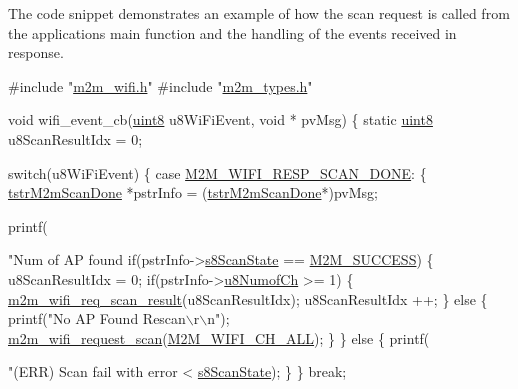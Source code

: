 The code snippet demonstrates an example of how the scan request is called from the application\textquotesingle{}s main function and the handling of the events received in response. 
\begin{DoxyCode}
\textcolor{preprocessor}{#include "\hyperlink{m2m__wifi_8h}{m2m\_wifi.h}"}
\textcolor{preprocessor}{#include "\hyperlink{m2m__types_8h}{m2m\_types.h}"}

\textcolor{keywordtype}{void} wifi\_event\_cb(\hyperlink{group__DataT_ga4df709a77647e870bbf1d955b8edc9a6}{uint8} u8WiFiEvent, \textcolor{keywordtype}{void} * pvMsg)
\{
    \textcolor{keyword}{static} \hyperlink{group__DataT_ga4df709a77647e870bbf1d955b8edc9a6}{uint8}    u8ScanResultIdx = 0;
    
    \textcolor{keywordflow}{switch}(u8WiFiEvent)
    \{
    \textcolor{keywordflow}{case} \hyperlink{group__WlanEnums_gga064de09dec1d5e88ed8d075fa40f57dead835febbe18b7e3cc6ce4693951354fe}{M2M\_WIFI\_RESP\_SCAN\_DONE}:
        \{
            \hyperlink{structtstrM2mScanDone}{tstrM2mScanDone} *pstrInfo = (\hyperlink{structtstrM2mScanDone}{tstrM2mScanDone}*)pvMsg;
            
            printf(\textcolor{stringliteral}{"Num of AP found %
            \textcolor{keywordflow}{if}(pstrInfo->\hyperlink{structtstrM2mScanDone_adf06f5d0db8d0fb98e7674672ee8439d}{s8ScanState} == \hyperlink{nm__common_8h_a9ef27ba27aafdd1aa3a79d3ba2c36b8f}{M2M\_SUCCESS})
            \{
                u8ScanResultIdx = 0;
                \textcolor{keywordflow}{if}(pstrInfo->\hyperlink{structtstrM2mScanDone_a1303b806dd93bfdd4b4a51ad750b023b}{u8NumofCh} >= 1)
                \{
                    \hyperlink{group__WifiReqScanResult_ga2585ee08ee8ecac67155ec99dd4d0863}{m2m\_wifi\_req\_scan\_result}(u8ScanResultIdx);
                    u8ScanResultIdx ++;
                \}
                \textcolor{keywordflow}{else}
                \{
                    printf(\textcolor{stringliteral}{"No AP Found Rescan\(\backslash\)r\(\backslash\)n"});
                    \hyperlink{group__WifiRequestScanFn_ga499dfa24a19c2e84776aeabedf897135}{m2m\_wifi\_request\_scan}(\hyperlink{group__WlanEnums_gga2a91dd671e2672dba1a7ed45230f3a99a9ab262cc4f83b59a0710ffb80134c637}{M2M\_WIFI\_CH\_ALL});
                \}
            \}
            \textcolor{keywordflow}{else}
            \{
                printf(\textcolor{stringliteral}{"(ERR) Scan fail with error <%
      \hyperlink{structtstrM2mScanDone_adf06f5d0db8d0fb98e7674672ee8439d}{s8ScanState});
            \}
        \}
        \textcolor{keywordflow}{break};
    
}}
\end{DoxyCode}
